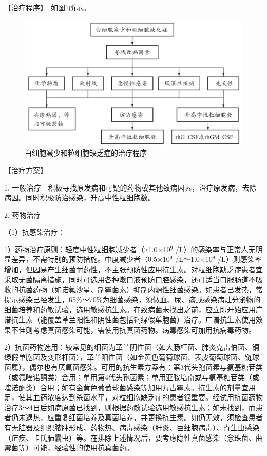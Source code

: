 【治疗程序】　如图\ref{fig5-3-1}所示。

\begin{figure}[!htbp]
 \centering
 \includegraphics{./images/Image00152.jpg}
 \captionsetup{justification=centering}
 \caption{白细胞减少和粒细胞缺乏症的治疗程序}
 \label{fig5-3-1}
  \end{figure} 

【治疗方案】

1.
一般治疗　积极寻找原发病和可疑的药物或其他致病因素，治疗原发病，去除病因。同时积极防治感染，升高中性粒细胞数。

2. 药物治疗

（1）抗感染治疗：

1）药物治疗原则：轻度中性粒细胞减少者（≥1.0×10$^{9}$
/L）的感染率与正常人无明显差异，不需特别的预防措施。中度减少者（0.5×10$^{9}$
/L～1.0×10$^{9}$
/L）则感染率增加，但因易产生细菌耐药性，不主张预防性应用抗生素。对粒细胞缺乏症患者宜采取无菌隔离措施，同时可选用各种漱口液预防口腔感染，还可适当口服肠道不吸收的抗菌药物（如诺氟沙星、制霉菌素）抑制内源性细菌感染。如患者已发热，常提示感染已经发生，65\%～70\%为细菌感染，须做血、尿、痰或感染病灶分泌物的细菌培养和药敏试验，选用敏感抗生素。在致病菌未找出之前，应立即开始应用广谱抗生素（能覆盖革兰阳性和阴性菌包括铜绿假单胞菌）治疗。广谱抗生素使用效果不佳则考虑真菌感染可能，需使用抗真菌药物。病毒感染可加用抗病毒药物。

2）抗菌药物选用：较常见的细菌为革兰阴性菌（如大肠杆菌、肺炎克雷伯菌、铜绿假单胞菌及变形杆菌），革兰阳性菌（如金黄色葡萄球菌、表皮葡萄球菌、链球菌属），偶尔也有厌氧菌感染。可用的抗生素方案有：第3代头孢菌素与氨基糖苷类（或氟喹诺酮类）合用；单用第4代头孢菌素；单用亚胺培南或与氨基糖苷类（或喹诺酮类）合用；如有金黄色葡萄球菌感染等加用万古霉素。抗生素的剂量宜用足，使其血药浓度达到杀菌水平，对粒细胞缺乏症的患者很重要。经试用抗菌药物治疗3～4日后如病原菌已找到，则根据药敏试验选用敏感抗生素；如未找到，而患者仍未退热，应重复细菌培养及真菌培养，并更换抗生素。如仍无效，须检查患者有无脏器及组织脓肿形成、药物热、病毒感染（肝炎、巨细胞病毒）、寄生虫感染（疟疾、卡氏肺囊虫）等。在排除上述情况后，要考虑隐性真菌感染（念珠菌、曲霉菌等）可能，经验性的使用抗真菌药。

